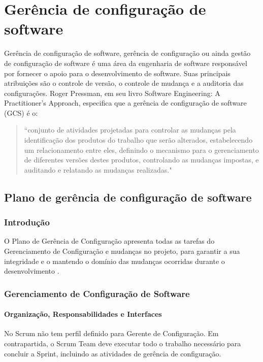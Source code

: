 \section{Gerência de configuração de software}
\label{sec:gerenciaconfig}

Gerência de configuração de software, gerência de configuração ou ainda gestão de configuração de software é uma área da engenharia de software responsável por fornecer o apoio para o desenvolvimento de software. Suas principais atribuições são o controle de versão, o controle de mudança e a auditoria das configurações. Roger Pressman, em seu livro Software Engineering: A Practitioner's Approach, especifica que a gerência de configuração de software (GCS) é o:

\begin{quote}
“conjunto de atividades projetadas para controlar as mudanças pela identificação dos produtos do trabalho que serão alterados, estabelecendo um relacionamento entre eles, definindo o mecanismo para o gerenciamento de diferentes versões destes produtos, controlando as mudanças impostas, e auditando e relatando as mudanças realizadas." \cite{wikiconfig:16}
\end{quote}

\subsection{Plano de gerência de configuração de software}

\subsubsection{Introdução}

O Plano de Gerência de Configuração apresenta todas as tarefas do Gerenciamento de Configuração e mudanças no projeto, para garantir a sua integridade e o mantendo o domínio das mudanças ocorridas durante o desenvolvimento \cite{moraes:16}.

\subsubsection{Gerenciamento de Configuração de Software}

\paragraph{Organização, Responsabilidades e Interfaces} 

No Scrum não tem perfil definido para Gerente de Configuração. Em contrapartida, o Scrum Team deve executar todo o trabalho necessário para concluir a Sprint, incluindo as atividades de gerência de configuração.

